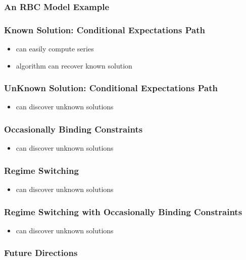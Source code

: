 \documentclass[tikz]{beamer}
\begin{document}
\begin{frame}
\frametitle{An RBC Model Example}
\end{frame}
\begin{frame}
\frametitle{Known Solution: Conditional Expectations Path}
\begin{itemize}
\item can easily compute series
\item algorithm can recover known solution
\end{itemize}


\end{frame}




\begin{frame}
\frametitle{UnKnown Solution: Conditional Expectations Path}
\begin{itemize}
\item can discover unknown solutions
\end{itemize}



\end{frame}



\begin{frame}
\frametitle{Occasionally Binding Constraints}
\begin{itemize}
\item can discover unknown solutions
\end{itemize}



\end{frame}


\begin{frame}
\frametitle{Regime Switching}
\begin{itemize}
\item can discover unknown solutions
\end{itemize}


\end{frame}

\begin{frame}
\frametitle{Regime Switching with Occasionally Binding Constraints}
\begin{itemize}
\item can discover unknown solutions
\end{itemize}

\end{frame}
\begin{frame}
\frametitle{Future Directions}
\end{frame}
\end{document}
